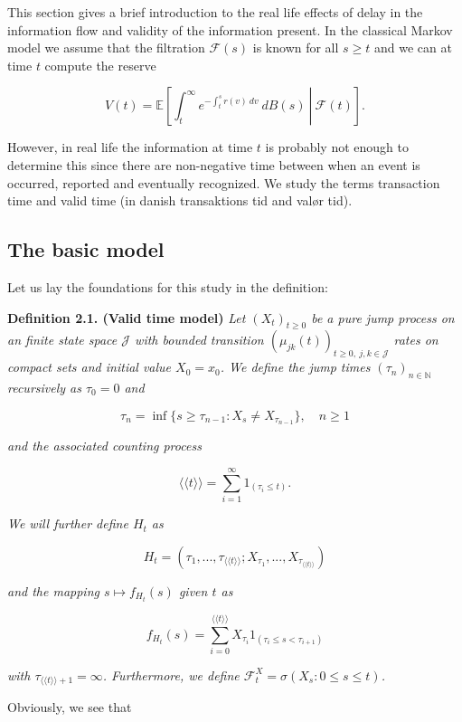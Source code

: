 \documentclass[a4paper,10pt,openany]{book}
\begin{document}
This section gives a brief introduction to the real life effects of delay in the information flow and validity of the information present. In the classical Markov model we assume that the filtration \(\mathcal F(s)\) is known for all \(s\ge t\) and we can at time \(t\) compute the reserve

\[
V(t)=\mathbb E\left[\left.\int_t^\infty e^{-\int_t^sr(v)\ dv}\ dB(s)\ \right\vert\ \mathcal F(t)\right].
\]

However, in real life the information at time \(t\) is probably not enough to determine this since there are non-negative time between when an event is occurred, reported and eventually recognized. We study the terms transaction time and valid time (in danish transaktions tid and valør tid).

\hypertarget{the-basic-model}{%
\subsection{The basic model}\label{the-basic-model}}

Let us lay the foundations for this study in the definition:

\textbf{Definition 2.1. (Valid time model)} \emph{Let \((X_t)_{t\ge 0}\) be a pure jump process on an finite state space \(\mathcal J\) with bounded transition \((\mu_{jk}(t))_{t\ge 0,\ j,k\in\mathcal J}\) rates on compact sets and initial value \(X_0=x_0\). We define the jump times \((\tau_n)_{n\in\mathbb N}\) recursively as \(\tau_0=0\) and}

\[
\tau_n=\inf\{s\ge \tau_{n-1} : X_s\ne X_{\tau_{n-1}}\},\quad n\ge 1
\]

\emph{and the associated counting process}

\[
\langle\langle t \rangle\rangle=\sum_{i=1}^\infty 1_{(\tau_i\le t)}.
\]

\emph{We will further define \(H_t\) as}

\[
H_t=\left(\tau_1,...,\tau_{\langle\langle t \rangle\rangle};X_{\tau_1},...,X_{\tau_{\langle\langle t \rangle\rangle}}\right)
\]

\emph{and the mapping \(s\mapsto f_{H_t}(s)\) given \(t\) as}

\[
f_{H_t}(s)=\sum_{i=0}^{\langle\langle t \rangle\rangle}X_{\tau_i}1_{(\tau_{i}\le s< \tau_{i+1})}
\]

\emph{with \(\tau_{\langle\langle t \rangle\rangle + 1}=\infty\). Furthermore, we define \(\mathcal F^X_t=\sigma(X_s : 0\le s\le t)\).}

Obviously, we see that
\end{document}
